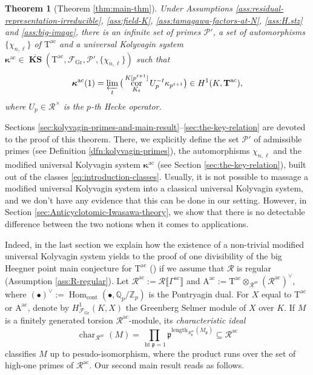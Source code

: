 \documentclass[12pt,reqno]{amsart}
\newtheorem{theoremx}{Theorem}
\theoremstyle{definition}
\theoremstyle{remark}
\newcommand{\numberset}{\mathbb}
\newcommand{\Q}{\numberset{Q}}
\newcommand{\Z}{\numberset{Z}}
\newcommand{\T}{\boldsymbol{\mathrm{T}}}
\newcommand{\calR}{\mathcal{R}}
\newcommand{\A}{\boldsymbol{\mathrm{A}}}
\DeclareMathOperator{\Hom}{Hom}
\DeclareMathOperator{\Char}{char}
\DeclareMathOperator{\Cor}{cor}
\DeclareMathOperator{\hight}{\mathrm{ht}}
\DeclareMathOperator{\ks}{KS}
\newcommand{\KS}{\boldsymbol{\ks}}
\newcommand{\ac}{\mathrm{ac}}
\newcommand{\Gr}{\mathrm{Gr}}
\newcommand{\cont}{\mathrm{cont}}
\newcommand{\length}{\mathrm{length}}
\newcommand{\gk}{\kappa}
\newcommand{\p}{\mathfrak{p}}
\begin{document}
\begin{theoremx}[Theorem \ref{thm:main-thm}]\label{thm:A}
    Under Assumptions \ref{ass:residual-representation-irreducible}, \ref{ass:field-K}, \ref{ass:tamagawa-factors-at-N}, \ref{ass:H.stz} and \ref{ass:big-image}, there is an infinite set of primes $\mathcal{P}'$, a set of automorphisms $\{\chi_{n,\ell}\}$ of $\T^{\ac}$ and a universal Kolyvagin system $\boldsymbol{\gk}^{\ac}\in\overline{\KS}(\T^{\ac},\mathcal{F}_{\Gr},\mathcal{P}',\{\chi_{n,\ell}\})$ such that
    \begin{equation*}
        \boldsymbol{\gk}^{\ac}(1)=\varprojlim_t\big(\Cor^{K[p^{t+1}]}_{K_t}U_p^{-t}\gk_{p^{t+1}}\big)\in H^1(K,\T^{\ac}),
    \end{equation*}
    where $U_p\in\calR^\times$ is the $p$-th Hecke operator.
\end{theoremx}


Sections \ref{sec:kolyvagin-primes-and-main-result}--\ref{sec:the-key-relation} are devoted to the proof of this theorem. There, we explicitly define the set $\mathcal{P}'$ of admissible primes (see Definition \ref{dfn:kolyvagin-primes}), the automorphisms $\chi_{n,\ell}$ and the modified universal Kolyvagin system $\boldsymbol{\gk}^{\ac}$ (see Section \ref{sec:the-key-relation}), built out of the classes \eqref{eq:introduction-classes}. Usually, it is not possible to massage a modified universal Kolyvagin system into a classical universal Kolyvagin system, and we don't have any evidence that this can be done in our setting. However, in Section \ref{sec:Anticyclotomic-Iwasawa-theory}, we show that there is no detectable difference between the two notions when it comes to applications.

Indeed, in the last section we explain how the existence of a non-trivial modified universal Kolyvagin system yields to the proof of one divisibility of the big Heegner point main conjecture for $\T^\ac$ (\cite[Conjecture 10.8]{Longo-Vigni11:quaternion-algebras-Hida-families}) if we assume that $\calR$ is regular (Assumption \ref{ass:R-regular}). Let $\calR^\ac:=\calR\llbracket\Gamma^\ac\rrbracket$ and $\A^\ac:=\T^\ac\otimes_{\calR^\ac}(\calR^\ac)^\vee$, where $(\bullet)^\vee:=\Hom_{\cont}(\bullet,\Q_p/\Z_p)$ is the Pontryagin dual. For $X$ equal to $\T^\ac$ or $\A^\ac$, denote by $H^1_{\mathcal{F}_\Gr}(K,X)$ the Greenberg Selmer module of $X$ over $K$. If $M$ is a finitely generated torsion $\calR^\ac$-module, its \emph{characteristic ideal}
\begin{equation*}
         \Char_{\calR^{\ac}}(M)=\prod_{\hight\p=1} \p^{\length_{\calR^\ac_\p}(M_\p)}\subseteq \calR^\ac
\end{equation*}
classifies $M$ up to pesudo-isomorphism, where the product runs over the set of high-one primes of $\calR^\ac$. Our second main result reads as follows.
\end{document}
